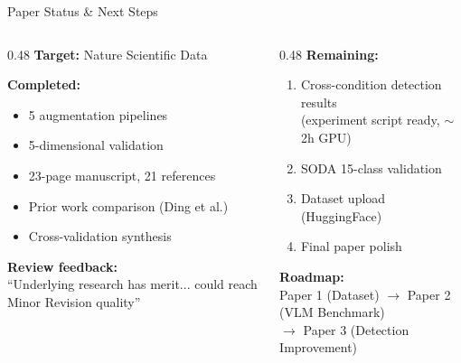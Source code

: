 \documentclass[aspectratio=169, 11pt]{beamer}
\begin{document}
\begin{frame}{Paper Status \& Next Steps}

\begin{columns}[T]
\begin{column}{0.48\textwidth}
\textbf{Target:} Nature Scientific Data

\vspace{0.5em}
\textbf{Completed:}
\begin{itemize}\setlength\itemsep{0.1em}
    \item 5 augmentation pipelines
    \item 5-dimensional validation
    \item 23-page manuscript, 21 references
    \item Prior work comparison (Ding et al.)
    \item Cross-validation synthesis
\end{itemize}

\vspace{0.5em}
\textbf{Review feedback:}\\
{\small ``Underlying research has merit... could reach Minor Revision quality''}
\end{column}
\begin{column}{0.48\textwidth}
\textbf{Remaining:}
\begin{enumerate}\setlength\itemsep{0.1em}
    \item Cross-condition detection results\\{\footnotesize (experiment script ready, $\sim$2h GPU)}
    \item SODA 15-class validation
    \item Dataset upload (HuggingFace)
    \item Final paper polish
\end{enumerate}

\vspace{0.5em}
\textbf{Roadmap:}\\
{\small Paper 1 (Dataset) $\to$ Paper 2 (VLM Benchmark)\\$\to$ Paper 3 (Detection Improvement)}
\end{column}
\end{columns}
\end{frame}


\appendix
\end{document}
